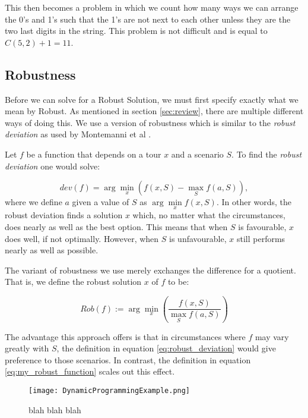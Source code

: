 This then becomes a problem in which we count how many ways we can arrange the 0's and 1's such that the 1's are not next to each other unless they are the two last digits in the string. This problem is not difficult and is equal to $C(5,2)+1 = 11$.
\subsection{Robustness}
Before we can solve for a Robust Solution, we must first specify exactly what we mean by Robust. As mentioned in section \ref{sec:review}, there are multiple different ways of doing this. We use a version of robustness which is similar to the \textit{robust deviation} as used by Montemanni et al \cite{montemanni2007robust}.

Let $f$ be a function that depends on a tour $x$ and a scenario $S$. To find the \textit{robust deviation} one would solve:

\begin{equation}
\label{eq:robust_deviation}
dev(f) = \arg\min \limits_x \left( f(x,S) - \max \limits_S f(a, S)\right),
\end{equation}
where we define $a$ given a value of $S$ as $\arg\min \limits_x f(x,S)$. In other words, the robust deviation finds a solution $x$ which, no matter what the circumstances, does nearly as well as the best option. This means that when $S$ is favourable, $x$ does well, if not optimally. However, when $S$ is unfavourable, $x$ still performs nearly as well as possible.

The variant of robustness we use merely exchanges the difference for a quotient. That is, we define the robust solution $x$ of $f$ to be:

\begin{equation}
\label{eq:my_robust_function}
Rob(f) := \arg\min\limits_x \left(\frac{f(x,S)}{\max \limits_S f(a,S)} \right)
\end{equation}

The advantage this approach offers is that in circumstances where $f$ may vary greatly with $S$, the definition in equation \ref{eq:robust_deviation} would give preference to those scenarios. In contrast, the definition in equation \ref{eq:my_robust_function} scales out this effect.

\begin{figure}[h!]
	\centering
	\texttt{[image: DynamicProgrammingExample.png]}
	\caption{blah blah blah}
	\label{fig:dynam_ex2}
\end{figure}


